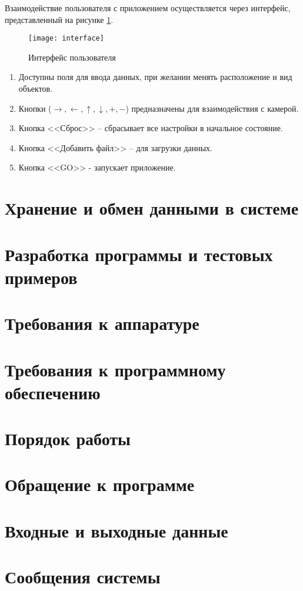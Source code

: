 Взаимодействие пользователя с приложением осуществляется через интерфейс, представленный на рисунке \ref{img:interface}. 

\begin{figure}[H]
	\centering
	\texttt{[image: interface]}
	\caption{Интерфейс пользователя}
	\label{img:interface}
\end{figure}

\begin{enumerate}
	\item Доступны поля для ввода данных, при желании менять расположение и вид объектов. 
	\item Кнопки ($\to, \leftarrow, \uparrow, \downarrow, +, -$) предназначены для взаимодействия с камерой. 
	\item Кнопка  <<Сброс>> -- сбрасывает все настройки в начальное состояние. 
	\item Кнопка <<Добавить файл>> -- для загрузки данных. 
	\item Кнопка <<GO>> - запускает приложение.   
\end{enumerate}

\section{\textbf{Хранение и обмен данными в системе }}


\section{\textbf{Разработка программы и тестовых примеров }}


\section{\textbf{Требования к аппаратуре }}


\section{\textbf{Требования к программному обеспечению }}


\section{\textbf{Порядок работы }}


\section{\textbf{Обращение к программе }}


\section{\textbf{Входные и выходные данные }}


\section{\textbf{Сообщения  системы }}

